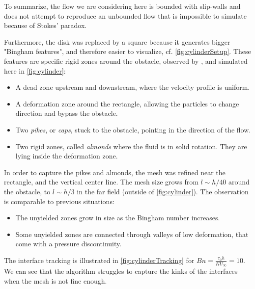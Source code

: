 \documentclass[11 pt]{report}
\begin{document}
To summarize, the flow we are considering here is bounded with slip-walls and does not attempt to reproduce an unbounded flow that is impossible to simulate because of Stokes' paradox.



Furthermore, the disk was replaced by a square because it generates bigger "Bingham features", and therefore easier to visualize, cf. \cref{fig:cylinderSetup}. These features are specific rigid zones around the obstacle, observed by \cite{adaptiveCylinder,simulationCylinder}, and simulated here in \cref{fig:cylinder}:
\begin{itemize}
    \item A dead zone upstream and downstream, where the velocity profile is uniform.
    \item A deformation zone around the rectangle, allowing the particles to change direction and bypass the obstacle.
    \item Two \textit{pikes}, or \textit{caps}, stuck to the obstacle, pointing in the direction of the flow.
    \item Two rigid zones, called \textit{almonds} where the fluid is in solid rotation. They are lying inside the deformation zone.
\end{itemize}

In order to capture the pikes and almonds, the mesh was refined near the rectangle, and the vertical center line. The mesh size grows from $l \sim h/40$ around the obstacle, to $l \sim h/3$ in the far field (outside of \cref{fig:cylinder}). The observation is comparable to previous situations:
\begin{itemize}
    \item The unyielded zones grow in size as the Bingham number increases.
    \item Some unyielded zones are connected through valleys of low deformation, that come with a pressure discontinuity.
\end{itemize}

The interface tracking is illustrated in \cref{fig:cylinderTracking} for $Bn=\frac{\tau_0 h}{K U_{\infty}}=10$. We can see that the algorithm struggles to capture the kinks of the interfaces when the mesh is not fine enough. 
\end{document}
